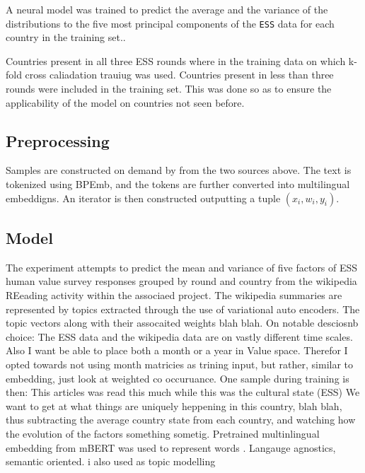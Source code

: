 A neural model was trained to predict the average and the variance of the distributions to the five most principal components of the \texttt{ESS} data for each country in the training set..

Countries present in all three ESS rounds where in the training data on which k-fold cross caliadation trauiug was used.
Countries present in less than three rounds were included in the training set. This was done so as to
ensure the applicability of the model on countries not seen before.

\subsection*{Preprocessing}
Samples are constructed on demand by from the two sources above.
The text is tokenized using BPEmb, and the tokens are further converted into multilingual embeddigns.
An iterator is then constructed outputting a tuple $(x_i, w_i, y_i)$.

\subsection*{Model}
The experiment attempts to predict the mean and variance of five factors of ESS human value survey responses grouped by round and country from the wikipedia REeading activity within the associaed project.
The wikipedia summaries are represented by topics extracted through the use of variational auto encoders. The topic vectors along with their assocaited weights blah blah.
On notable desciosnb choice: The ESS data and the wikipedia data are on vastly different time scales. Also I want be able to place both a month or a year in Value space. Therefor I opted towards not using month matricies as trining input, but rather, similar to embedding, just look at weighted co occuruance. One sample during training is then: This articles was read this much while this was the cultural state (ESS)
We want to get at what things are uniquely heppening in this country, blah blah, thus subtracting the average country state from each country, and watching how the evolution of the factors something sometig.
Pretrained multinlingual embedding from mBERT was used to represent words \cite{artetxe-etal-2017-learning}. Langauge agnostics, semantic oriented.
\cite{kingma2013auto} i also used as topic modelling
\cite{DBLP:journals/corr/abs-1810-04805}
\cite{Wu2020}


